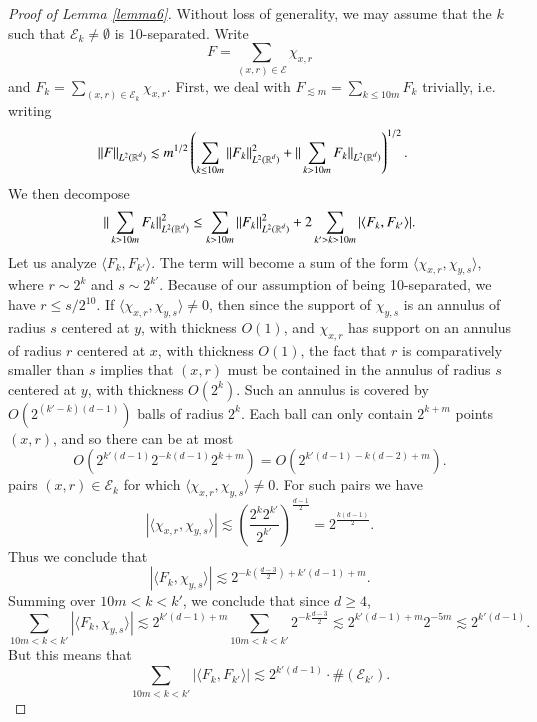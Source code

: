 \begin{proof}[Proof of Lemma \ref{lemma6}]
    Without loss of generality, we may assume that the $k$ such that $\mathcal{E}_k \neq \emptyset$ is $10$-separated. Write
    \[ F = \sum_{(x,r) \in \mathcal{E}} \chi_{x,r} \]
    and $F_k = \sum_{(x,r) \in \mathcal{E}_k} \chi_{x,r}$. First, we deal with $F_{\lesssim m} = \sum_{k \leq 10 m} F_k$ trivially, i.e. writing
    \begin{align*}
        \| F \|_{L^2(\operatorname{\mathbb{R}}^d)} &\lesssim m^{1/2} \left( \sum_{k \leq 10m} \| F_k \|_{L^2(\operatorname{\mathbb{R}}^d)}^2 + \| \sum_{k > 10m} F_k \|_{L^2(\operatorname{\mathbb{R}}^d)} \right)^{1/2}.
    \end{align*}
    We then decompose
    \[ \| \sum_{k > 10 m} F_k \|_{L^2(\operatorname{\mathbb{R}}^d)}^2 \leq \sum_{k > 10 m} \| F_k \|_{L^2(\operatorname{\mathbb{R}}^d)}^2 + 2 \sum_{k' > k > 10m} |\langle F_k, F_{k'} \rangle|. \]
    Let us analyze $\langle F_k, F_{k'} \rangle$. The term will become a sum of the form $\langle \chi_{x,r}, \chi_{y,s} \rangle$, where $r \sim 2^k$ and $s \sim 2^{k'}$. Because of our assumption of being 10-separated, we have $r \leq s / 2^{10}$. If $\langle \chi_{x,r}, \chi_{y,s} \rangle \neq 0$, then since the support of $\chi_{y,s}$ is an annulus of radius $s$ centered at $y$, with thickness $O(1)$, and $\chi_{x,r}$ has support on an annulus of radius $r$ centered at $x$, with thickness $O(1)$, the fact that $r$ is comparatively smaller than $s$ implies that $(x,r)$ must be contained in the annulus of radius $s$ centered at $y$, with thickness $O(2^k)$. Such an annulus is covered by $O( 2^{(k'-k)(d-1)} )$ balls of radius $2^k$. Each ball can only contain $2^{k + m}$ points $(x,r)$, and so there can be at most
    \[ O(2^{k'(d-1)} 2^{-k(d-1)} 2^{k+m} ) = O( 2^{k'(d-1) - k(d-2) + m} ). \]
    pairs $(x,r) \in \mathcal{E}_k$ for which $\langle \chi_{x,r}, \chi_{y,s} \rangle \neq 0$. For such pairs we have
    \[ |\langle \chi_{x,r}, \chi_{y,s} \rangle| \lesssim \left( \frac{2^k 2^{k'}}{2^{k'}} \right)^{\frac{d-1}{2}} = 2^{\frac{k(d-1)}{2}}. \]
    Thus we conclude that
    \[ |\langle F_k, \chi_{y,s} \rangle| \lesssim 2^{-k ( \frac{d-3}{2} ) + k'(d-1) + m }. \]
    Summing over $10m < k < k'$, we conclude that since $d \geq 4$,
    \[ \sum_{10m < k < k'} |\langle F_k, \chi_{y,s} \rangle| \lesssim 2^{k'(d-1) + m} \sum_{10m < k < k'} 2^{-k \frac{d-3}{2}} \lesssim 2^{k'(d-1) + m} 2^{-5m} \lesssim 2^{k'(d-1)}. \]
    But this means that
    \[ \sum_{10m < k < k'} |\langle F_k, F_{k'} \rangle| \lesssim 2^{k'(d-1)} \cdot \# ( \mathcal{E}_{k'} ). \]

\end{proof}
